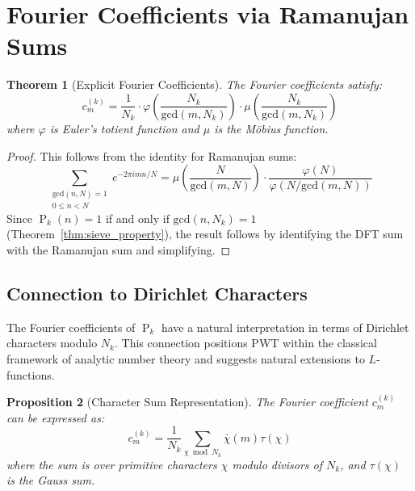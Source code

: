 ﻿\documentclass[12pt,a4paper]{report}
\theoremstyle{plain}
\newtheorem{theorem}{Theorem}[section]
\newtheorem{proposition}[theorem]{Proposition}
\theoremstyle{definition}
\renewcommand{\gcd}{\text{gcd}}
\renewcommand{\phi}{\varphi}
\DeclareMathOperator{\Pk}{P}
\begin{document}
\section{Fourier Coefficients via Ramanujan Sums}

\begin{theorem}[Explicit Fourier Coefficients]
\label{thm:fourier_coeff}
The Fourier coefficients satisfy:
\[
c_m^{(k)} = \frac{1}{N_k} \cdot \phi\left(\frac{N_k}{\gcd(m, N_k)}\right) \cdot \mu\left(\frac{N_k}{\gcd(m, N_k)}\right)
\]
where $\phi$ is Euler's totient function and $\mu$ is the M\"obius function.
\end{theorem}

\begin{proof}
This follows from the identity for Ramanujan sums:
\[
\sum_{\substack{\gcd(n,N)=1 \\ 0 \leq n < N}} e^{-2\pi imn/N} = \mu\left(\frac{N}{\gcd(m,N)}\right) \cdot \frac{\phi(N)}{\phi(N/\gcd(m,N))}
\]
Since $\Pk_k(n) = 1$ if and only if $\gcd(n, N_k) = 1$ (Theorem~\ref{thm:sieve_property}), the result follows by identifying the DFT sum with the Ramanujan sum and simplifying.
\end{proof}

\subsection{Connection to Dirichlet Characters}
\label{sec:dirichlet_connection}

The Fourier coefficients of $\Pk_k$ have a natural interpretation in terms of Dirichlet characters modulo $N_k$. This connection positions PWT within the classical framework of analytic number theory and suggests natural extensions to $L$-functions.

\begin{proposition}[Character Sum Representation]
\label{prop:character_connection}
The Fourier coefficient $c_m^{(k)}$ can be expressed as:
\[
c_m^{(k)} = \frac{1}{N_k} \sum_{\chi \bmod N_k} \bar{\chi}(m) \tau(\chi)
\]
where the sum is over primitive characters $\chi$ modulo divisors of $N_k$, and $\tau(\chi)$ is the Gauss sum.
\end{proposition}
\end{document}
